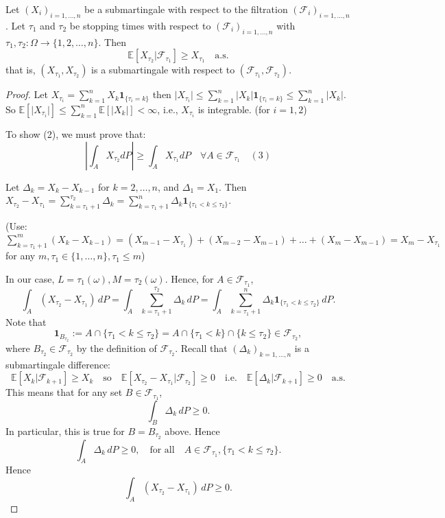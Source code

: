 \begin{theorem}
Let $(X_i)_{i=1,\ldots,n}$ be a submartingale with respect to the filtration $(\mathcal{F}_i)_{i=1,\ldots,n}$. Let $\tau_1$ and $\tau_2$ be stopping times with respect to $(\mathcal{F}_i)_{i=1,\ldots,n}$ with $\tau_1, \tau_2\colon \Omega \to \{1,2,\ldots,n\}$. Then
\begin{equation}
    \mathbb{E}[X_{\tau_2}|\mathcal{F}_{\tau_1}] \geq X_{\tau_1} \quad \text{a.s.}
\end{equation}
that is, $(X_{\tau_1}, X_{\tau_2})$ is a submartingale with respect to $(\mathcal{F}_{\tau_1}, \mathcal{F}_{\tau_2})$.
\end{theorem}

\begin{proof}
Let $X_{\tau_i} = \sum_{k=1}^n X_k \mathbf{1}_{\{\tau_i=k\}}$ then $\lvert X_{\tau_i} \rvert \leq \sum_{k=1}^n \lvert X_k \rvert \mathbf{1}_{\{\tau_i=k\}} \leq \sum_{k=1}^n \lvert X_k \rvert$. So $\mathbb{E}[\lvert X_{\tau_i} \rvert] \leq \sum_{k=1}^n \mathbb{E}[\lvert X_k \rvert] < \infty$, i.e., $X_{\tau_i}$ is integrable. (for $i=1,2$)

To show (2), we must prove that:
\begin{equation}
    \left\lvert \int_A X_{\tau_2} dP \right\rvert \geq \int_A X_{\tau_1} dP \quad \forall A \in \mathcal{F}_{\tau_1} \quad (3)
\end{equation}

Let $\Delta_k = X_k - X_{k-1}$ for $k=2,\ldots,n$, and $\Delta_1 = X_1$. Then $X_{\tau_2} - X_{\tau_1} = \sum_{k=\tau_1+1}^{\tau_2} \Delta_k = \sum_{k=\tau_1+1}^n \Delta_k \mathbf{1}_{\{\tau_1 < k \leq \tau_2\}}$.

(Use: $\sum_{k=\tau_1+1}^m (X_k - X_{k-1}) = (X_{m-1}-X_{\tau_1}) + (X_{m-2}-X_{m-1}) + \ldots + (X_{m}-X_{m-1}) = X_m - X_{\tau_1}$ for any $m,\tau_1 \in \{1,\ldots,n\}, \tau_1 \leq m$)

In our case, $L=\tau_1(\omega), M=\tau_2(\omega)$.
Hence, for $A \in \mathcal{F}_{\tau_1}$,
\[
\int_A (X_{\tau_2} - X_{\tau_1}) \, dP = \int_A \sum_{k=\tau_1+1}^{\tau_2} \Delta_k \, dP = \int_A \sum_{k=\tau_1+1}^n \Delta_k \mathbf{1}_{\{\tau_1 < k \leq \tau_2\}} \, dP.
\]
Note that
\[
\mathbf{1}_{B_{\tau_2}} := A \cap \{\tau_1 < k \leq \tau_2\} = A \cap \{\tau_1 < k\} \cap \{k \leq \tau_2\} \in \mathcal{F}_{\tau_2},
\]
where $B_{\tau_2} \in \mathcal{F}_{\tau_2}$ by the definition of $\mathcal{F}_{\tau_2}$. Recall that $(\Delta_k)_{k=1,\ldots,n}$ is a submartingale difference:
\[
\mathbb{E}[X_k | \mathcal{F}_{k+1}] \geq X_k \quad \text{so} \quad \mathbb{E}[X_{\tau_2} - X_{\tau_1} | \mathcal{F}_{\tau_2}] \geq 0 \quad \text{i.e.} \quad \mathbb{E}[\Delta_k | \mathcal{F}_{k+1}] \geq 0 \quad \text{a.s.}
\]
This means that for any set $B \in \mathcal{F}_{\tau_1}$,
\[
\int_B \Delta_k \, dP \geq 0.
\]
In particular, this is true for $B = B_{\tau_2}$ above. Hence
\[
\int_A \Delta_k \, dP \geq 0, \quad \text{for all} \quad A \in \mathcal{F}_{\tau_1}, \{\tau_1 < k \leq \tau_2\}.
\]
Hence
\[
\int_A (X_{\tau_2} - X_{\tau_1}) \, dP \geq 0.
\]
\end{proof}

